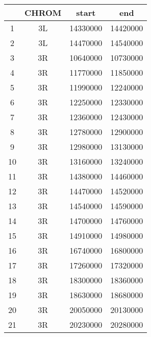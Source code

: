 \centering \begin{tabular}{c|c|c|c}
 	&CHROM	&start	&end\\\hline
1	&3L	&14330000	&14420000\\
2	&3L	&14470000	&14540000\\
3	&3R	&10640000	&10730000\\
4	&3R	&11770000	&11850000\\
5	&3R	&11990000	&12240000\\
6	&3R	&12250000	&12330000\\
7	&3R	&12360000	&12430000\\
8	&3R	&12780000	&12900000\\
9	&3R	&12980000	&13130000\\
10	&3R	&13160000	&13240000\\
11	&3R	&14380000	&14460000\\
12	&3R	&14470000	&14520000\\
13	&3R	&14540000	&14590000\\
14	&3R	&14700000	&14760000\\
15	&3R	&14910000	&14980000\\
16	&3R	&16740000	&16800000\\
17	&3R	&17260000	&17320000\\
18	&3R	&18300000	&18360000\\
19	&3R	&18630000	&18680000\\
20	&3R	&20050000	&20130000\\
21	&3R	&20230000	&20280000\\
\end{tabular}

